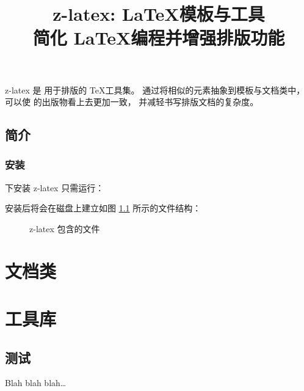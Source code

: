 \documentclass[CJK, oneside]{z-toolsdoc}
\title{z-latex: \boDz \LaTeX 模板与工具 \\
    简化 \LaTeX 编程并增强排版功能}
\author{\xjlzh}
\begin{document}
    \maketitle

\frontmatter
    z-latex 是 \boDz 用于排版的 \TeX 工具集。
    通过将相似的元素抽象到模板与文档类中，可以使 \boDz 的出版物看上去更加一致，
    并减轻书写排版文档的复杂度。

    \tableofcontents

\mainmatter
\chapter{简介}
    \section{安装}

    \Debian 下安装 z-latex 只需运行：


    安装后将会在磁盘上建立如图 \ref{fig:filetree} 所示的文件结构：

    \begin{figure} \label{fig:filetree}
    
    \caption{z-latex 包含的文件}
    \end{figure}

\part{文档类}

\part{工具库}
\chapter{测试}

    Blah blah blah\ldots
\end{document}
